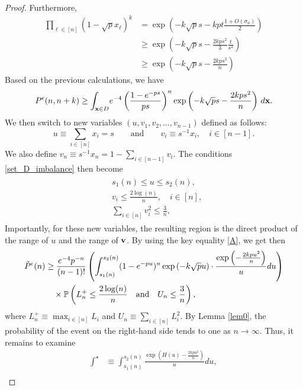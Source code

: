 \documentclass[11pt]{amsart}
\newcommand{\Prob}{\operatorname{\Bbb{P}}}
\theoremstyle{remark}
\numberwithin{equation}{section}
\begin{document}
\begin{proof}
Furthermore,
\begin{align*}
    \prod_{\ell\in [n]}(1-\sqrt{p}x_{\ell})^k 
    &= \exp\left(-k\sqrt{p}s-kpt\frac{1+O\left(\sigma_n\right)}{2}\right)\\
    &\geq \exp\left(-k\sqrt{p}s-\frac{2kps^2}{3}\frac{t}{s^2}\right)\\
    &\geq \exp\left(-k\sqrt{p}s-\frac{2kps^2}{n}\right)
\end{align*}
Based on the previous calculations, we have
\begin{align*}
P^\epsilon(n,n+k)\geq \int_{\bold x \in D}\!e^{-4} \left(\frac{1 - e^{-ps}}{ps} \right)^n \exp\left(-k\sqrt{p}s-\frac{2kps^2}{n}\right)\,d\bold x.
\end{align*}
We then switch to new variables $(u,v_1,v_2,\ldots,v_{n-1})$ defined as follows:
\begin{equation*}
    u \equiv \sum_{i \in [n]} x_i = s \qquad \text{and} \qquad v_i \equiv
    s^{-1}x_i, \quad i \in [n-1].
\end{equation*}
We also define $v_n \equiv s^{-1}x_n=1-\sum_{i \in [n-1]}v_i$. The conditions \eqref{set_D_imbalance} then become
\begin{align}
\begin{split}
&s_1(n)  \leq u \leq s_2(n), \\
&v_i \leq \frac{2\log(n)}{n},\quad i \in [n],\\
&\sum_{i \in [n]}v_i^2\leq \frac{3}{n},
\end{split}
\end{align}
Importantly, for these new variables, the resulting region is the direct product of the range of $u$ and the range of $\bold v$. By using the key equality \eqref{A},  we get then
\begin{align*}
\tilde{P}^\epsilon(n)& \geq \frac{e^{-4}p^{-n}}{(n-1)!} \left( \int_{s_1(n)}^{s_2(n)} (1 - e^{-pu})^n \exp\left(-k\sqrt{p}u\right)\cdot \frac{\exp\left(-\frac{2kpu^2}{n}\right)}{u} du \right)\\
&\quad\times \Prob\left(L^+_n  \leq \frac{2\log(n)}{n} \quad \text{and} \quad U_n \leq \frac{3}{n}\right),
\end{align*}
where $L^+_n \equiv  \max_{i \in [n]} L_i$ and $U_n \equiv \sum_{i \in [n]}L_i^2$. By Lemma \ref{lem0},  the probability of the event on the right-hand side tends to one as $n \to \infty$. Thus, it remains to examine
\begin{equation}\label{int*} 
\begin{aligned}
\int^\star& \equiv \int_{s_1(n)}^{s_2(n)}  \frac{\exp\left(H(u)-\frac{2kpu^2}{n}\right)}{u} du,\\

\end{aligned}
\end{equation}
\end{proof}
\end{document}

